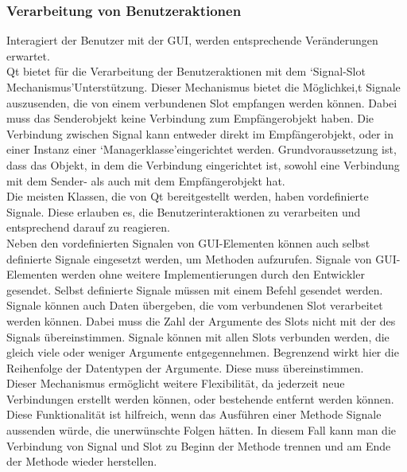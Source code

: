\subsubsection{Verarbeitung von Benutzeraktionen}
Interagiert der Benutzer mit der \ac{GUI}, werden entsprechende Veränderungen erwartet. \\
Qt bietet für die Verarbeitung der Benutzeraktionen mit dem \lq Signal-Slot Mechanismus\rq\space Unterstützung. Dieser Mechanismus bietet die Möglichkei,t Signale auszusenden, die von einem verbundenen Slot empfangen werden können. Dabei muss das Senderobjekt keine Verbindung zum Empfängerobjekt haben. Die Verbindung zwischen Signal kann entweder direkt im Empfängerobjekt, oder in einer Instanz einer \lq Managerklasse\rq\space eingerichtet werden. Grundvoraussetzung ist, dass das Objekt, in dem die Verbindung eingerichtet ist, sowohl eine Verbindung mit dem Sender- als auch mit dem Empfängerobjekt hat.\\
Die meisten Klassen, die von Qt bereitgestellt werden, haben vordefinierte Signale. Diese erlauben es, die Benutzerinteraktionen zu verarbeiten und entsprechend darauf zu reagieren. \\
Neben den vordefinierten Signalen von \ac{GUI}-Elementen können auch selbst definierte Signale eingesetzt werden, um Methoden aufzurufen. Signale von \ac{GUI}-Elementen werden ohne weitere Implementierungen durch den Entwickler gesendet. Selbst definierte Signale müssen mit einem Befehl gesendet werden. Signale können auch Daten übergeben, die vom verbundenen Slot verarbeitet werden können. Dabei muss die Zahl der Argumente des Slots nicht mit der des Signals übereinstimmen. Signale können mit allen Slots verbunden werden, die gleich viele oder weniger Argumente entgegennehmen. Begrenzend wirkt hier die Reihenfolge der Datentypen der Argumente. Diese muss übereinstimmen.\\
Dieser Mechanismus ermöglicht weitere Flexibilität, da jederzeit neue Verbindungen erstellt werden können, oder bestehende entfernt werden können. Diese Funktionalität ist hilfreich, wenn das Ausführen einer Methode Signale aussenden würde, die unerwünschte Folgen hätten. In diesem Fall kann man die Verbindung von Signal und Slot zu Beginn der Methode trennen und am Ende der Methode wieder herstellen. \\
